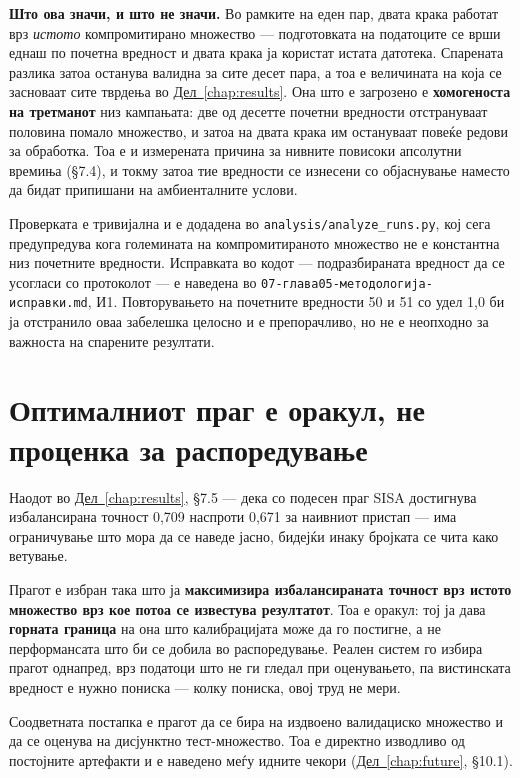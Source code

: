 \textbf{Што ова значи, и што не значи.} Во рамките на еден пар, двата крака работат врз \emph{истото}
компромитирано множество --- подготовката на податоците се врши еднаш по почетна вредност и
двата крака ја користат истата датотека. Спарената разлика затоа останува валидна за сите
десет пара, а тоа е величината на која се засноваат сите тврдења во \hyperref[chap:results]{Дел~\ref*{chap:results}}. Она што
е загрозено е \textbf{хомогеноста на третманот} низ кампањата: две од десетте почетни вредности
отстрануваат половина помало множество, и затоа на двата крака им остануваат повеќе редови за
обработка. Тоа е и измерената причина за нивните повисоки апсолутни времиња (§7.4), и токму
затоа тие вредности се изнесени со објаснување наместо да бидат припишани на амбиенталните
услови.

Проверката е тривијална и е додадена во \texttt{analysis/analyze\_runs.py}, кој сега предупредува кога
големината на компромитираното множество не е константна низ почетните вредности. Исправката
во кодот --- подразбираната вредност да се усогласи со протоколот --- е наведена во
\texttt{07-глава05-методологија-исправки.md}, И1. Повторувањето на почетните вредности 50 и 51 со
удел 1,0 би ја отстранило оваа забелешка целосно и е препорачливо, но не е неопходно за
важноста на спарените резултати.

\section{Оптималниот праг е оракул, не проценка за распоредување}

Наодот во \hyperref[chap:results]{Дел~\ref*{chap:results}}, §7.5 --- дека со подесен праг SISA достигнува избалансирана точност
0,709 наспроти 0,671 за наивниот пристап --- има ограничување што мора да се наведе јасно,
бидејќи инаку бројката се чита како ветување.

Прагот е избран така што ја \textbf{максимизира избалансираната точност врз истото множество врз
кое потоа се известува резултатот}. Тоа е оракул: тој ја дава \textbf{горната граница} на она што
калибрацијата може да го постигне, а не перформансата што би се добила во распоредување.
Реален систем го избира прагот однапред, врз податоци што не ги гледал при оценувањето, па
вистинската вредност е нужно пониска --- колку пониска, овој труд не мери.

Соодветната постапка е прагот да се бира на издвоено валидациско множество и да се оценува на
дисјунктно тест-множество. Тоа е директно изводливо од постојните артефакти и е наведено меѓу
идните чекори (\hyperref[chap:future]{Дел~\ref*{chap:future}}, §10.1).

